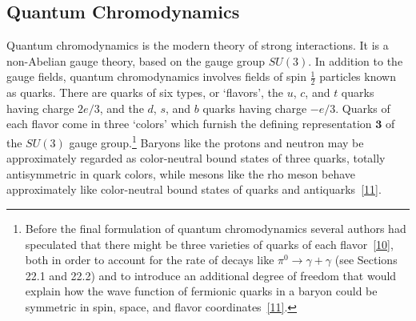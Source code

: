 
\subsection{Quantum Chromodynamics}
\label{sec:18.7}

Quantum chromodynamics is the modern theory of strong interactions. It is a non-Abelian gauge theory, based on the gauge group $SU(3)$. In addition to the gauge fields, quantum chromodynamics involves fields of spin $\frac{1}{2}$ particles known as quarks. There are quarks of six types, or `flavors', the $u$, $c$, and $t$ quarks having charge $2e/3$, and the $d$, $s$, and $b$ quarks having charge $-e/3$. Quarks of each flavor come in three `colors' which furnish the defining representation $\mathbf{3}$ of the $SU(3)$ gauge group.\footnote{Before the final formulation of quantum chromodynamics several authors had speculated that there might be three varieties of quarks of each flavor~\hyperref[ch18-ref-10]{[10]}, both in order to account for the rate of decays like $\pi^0\to\gamma+\gamma$ (see Sections 22.1 and 22.2) and to introduce an additional degree of freedom that would explain how the wave function of fermionic quarks in a baryon could be symmetric in spin, space, and flavor coordinates~\hyperref[ch18-ref-11]{[11]}.} Baryons like the protons and neutron may be approximately regarded as color-neutral bound states of three quarks, totally antisymmetric in quark colors, while mesons like the rho meson behave approximately like color-neutral bound states of quarks and antiquarks~\hyperref[ch18-ref-11]{[11]}.

